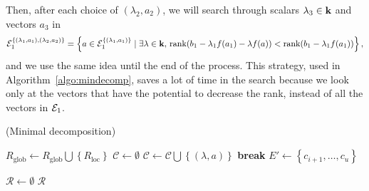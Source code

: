 Then, after each choice of $(\lambda_2, a_2)$, we will search through scalars
$\lambda_3\in\mathbf{k}$ and vectors $a_3$ in
\[
  \mathcal{E}_1^{\left\{ (\lambda_1, a_1), (\lambda_2, a_2) \right\}} = \left\{
    a\in\mathcal{E}_1^{ \left\{ (\lambda_1, a_1)
    \right\}}\;|\;\exists\lambda\in\mathbf{k},\,\operatorname{rank}(b_1-\lambda_1f(a_1)-\lambda f(a))
    <\operatorname{rank}(b_1-\lambda_1f(a_1))
\right\},
\]
and we use the same idea until the end of the process. This strategy, used in
Algorithm~\ref{algo:mindecomp}, 
saves a lot of time in the search because we look only at the vectors that have
the potential to decrease the rank, instead of all the vectors in $\mathcal{E}_1$.
\begin{algorithm}
  \caption{(Minimal decomposition)}
  \label{algo:mindecomp}
  \begin{algorithmic}[1]

    \State $R_\text{glob}\gets R_\text{glob}\bigcup\left\{R_\text{loc}\right\}$
    \Else
    \State $\mathcal C\gets\emptyset$
    \ForAll{$\lambda\in\K$}
    \State $\mathcal C\gets\mathcal C\bigcup\left\{ (\lambda, a) \right\}$
    \State \textbf{break}
    \EndIf
    \EndFor
    \EndFor
      \State $E'\gets\left\{ c_{i+1}, \dots, c_u \right\}$
    \State {}
    \EndFor
    \EndIf
    \EndProcedure

   \State $\mathcal R\gets\emptyset$
    \State {}
    \State \Return $\mathcal R$
  \end{algorithmic}
\end{algorithm}


